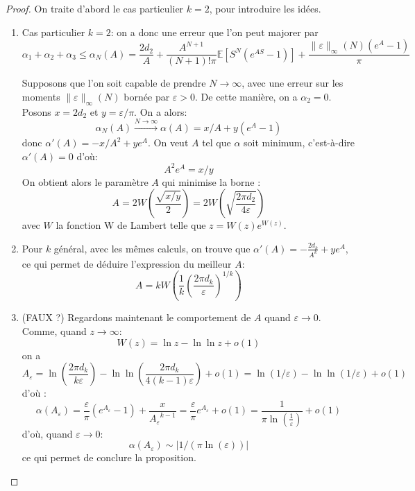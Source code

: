 \documentclass[12pt]{article}
\newcounter{prop}[section]
\newcommand{\pth}[1]{\left(#1\right)}
\newcommand{\cro}[1]{\left[#1\right]}
\newcommand{\abs}[1]{\left|#1\right|}
\newcommand{\dabs}[1]{\|#1\|}
\newcommand{\Esp}[1]{\mathbb{E}\cro{#1}}
\begin{document}
\begin{proof} On traite d'abord le cas particulier $k=2$, pour introduire les idées.
\begin{enumerate}
\item Cas particulier $k=2$: on a donc une erreur que l'on peut majorer par
\[\alpha_1+\alpha_2+\alpha_3 \leqslant \alpha_N(A)=\frac{2d_2}{A}+\frac{A^{N+1}}{(N+1)!\pi}\Esp{S^N(e^{AS}-1)}+\frac{\dabs{\varepsilon}_{\infty}(N)(e^A-1)}{\pi}\]

Supposons que l'on soit capable de prendre $N\to\infty$, avec une erreur sur les moments $\dabs{\varepsilon}_{\infty}(N)$ bornée par $\varepsilon>0$. De cette manière, on a $\alpha_2=0$. Posons $x=2d_2$ et $y=\varepsilon/\pi$. On a alors:
\[\alpha_N(A)\xrightarrow{N\to\infty}\alpha(A)=x/A+y(e^A-1)\]
donc $\alpha'(A)=-x/A^2+ye^A$. On veut $A$ tel que $\alpha$ soit minimum, c'est-à-dire $\alpha'(A)=0$ d'où:
\[A^2e^A=x/y\]
On obtient alors le paramètre $A$ qui minimise la borne : 
\[A = 2W\pth{\frac{\sqrt{x/y}}2} = 2W\pth{\sqrt{\frac{2\pi d_2}{4 \varepsilon}}}\]
avec $W$ la fonction W de Lambert telle que $z=W(z)e^{W(z)}$.

\item Pour $k$ général, avec les mêmes calculs, on trouve que $\alpha'(A)=-\frac{2d_k}{A^k}+ye^A$, ce qui permet de déduire l'expression du meilleur $A$:
\[A=kW\pth{\frac{1}{k}\pth{\frac{2\pi d_k}{\varepsilon}}^{1/k}}\]

\item (FAUX ?) Regardons maintenant le comportement de $A$ quand $\varepsilon\to 0$.
  Comme, quand $z\to\infty$:
  \[W(z)=\ln z-\ln\ln z+o(1)\]
  on a
  \[A_\varepsilon=\ln\pth{\frac{2\pi d_k}{k\varepsilon}}-\ln\ln\pth{\frac{2\pi d_k}{4(k-1)\varepsilon}}+o(1)= \ln(1/\varepsilon)-\ln\ln(1/\varepsilon)+o(1)\] 
d'où :
\[\alpha(A_\varepsilon)=\frac{\varepsilon}{\pi}(e^{A_\varepsilon}-1) + \frac{x}{{A_\varepsilon}^{k-1}}=\frac{\varepsilon}{\pi}e^{A_{\varepsilon}}+o(1)=\frac{1}{\pi\ln\pth{\frac{1}{\varepsilon}}}+o(1)\]
d'où, quand $\varepsilon\to 0$:
\[\alpha(A_\varepsilon)\sim \abs{1/(\pi\ln(\varepsilon))}\]
ce qui permet de conclure la proposition. 
\end{enumerate}
\end{proof}
\end{document}

